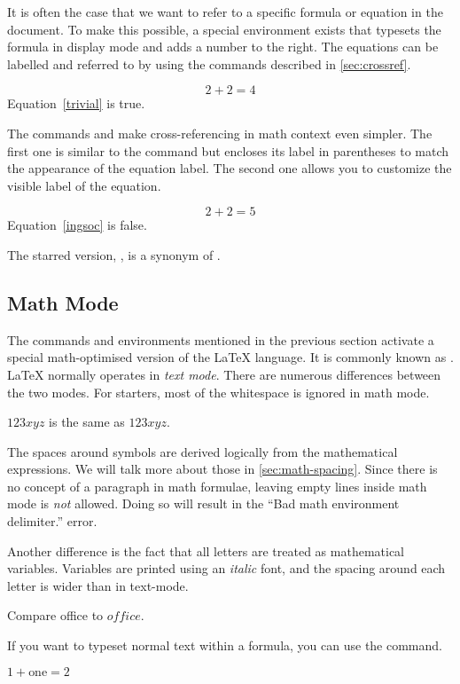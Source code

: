 It is often the case that we want to refer to a specific formula or equation in
the document. To make this possible, a special  environment exists
that typesets the formula in display mode and adds a number to the right. The
equations can be labelled and referred to by using the commands described in
\autoref{sec:crossref}.
\begin{example}
\begin{equation}
  \label{trivial}
  2 + 2 = 4
\end{equation}
Equation~\ref{trivial}
is true.
\end{example}
The commands  and  make cross-referencing in math context
even simpler. The first one is similar to the  command but encloses its
label in parentheses to match the appearance of the equation label. The second
one allows you to customize the visible label of the equation.
\begin{example}
\begin{equation}
  \tag{Ingsoc's theorem}
  \label{ingsoc}
  2 + 2 = 5
\end{equation}
Equation~\eqref{ingsoc} is false.
\end{example}
The starred version, , is a synonym of \csi{[}.

\subsection{Math Mode}

The commands and environments mentioned in the previous section activate a
special math-optimised version of the \LaTeX{} language. It is commonly known
as \emph{}. \LaTeX{} normally operates in \emph{text mode}. There
are numerous differences between the two modes. For starters, most of the
whitespace is ignored in math mode.
\begin{example}
\(123xyz\) is the same as \(
  1 2 3 x y z
\).
\end{example}
The spaces around symbols are derived logically from the mathematical
expressions. We will talk more about those in \autoref{sec:math-spacing}. Since
there is no concept of a paragraph in math formulae, leaving empty lines inside
math mode is \emph{not} allowed. Doing so will result in the \enquote{Bad math
  environment delimiter.} error.

Another difference is the fact that all letters are treated as mathematical
variables. Variables are printed using an \textit{italic} font, and the
spacing around each letter is wider than in text-mode.
\begin{example}
Compare office to \(office\).
\end{example}
If you want to typeset normal text within a formula, you can use the 
command.
\begin{example}
\( 1 + \text{one} = 2\)
\end{example}


